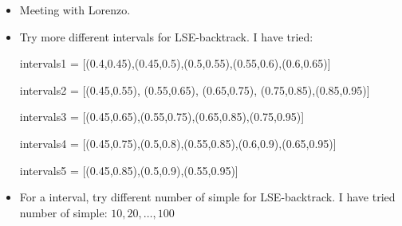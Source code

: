 
\begin{itemize}
	\item Meeting with Lorenzo.
	\item Try more different intervals for LSE-backtrack. I have tried:
	
	intervals1 = [(0.4,0.45),(0.45,0.5),(0.5,0.55),(0.55,0.6),(0.6,0.65)]

    intervals2 = [(0.45,0.55), (0.55,0.65), (0.65,0.75), (0.75,0.85),(0.85,0.95)]

    intervals3 = [(0.45,0.65),(0.55,0.75),(0.65,0.85),(0.75,0.95)]

    intervals4 = [(0.45,0.75),(0.5,0.8),(0.55,0.85),(0.6,0.9),(0.65,0.95)]

    intervals5 = [(0.45,0.85),(0.5,0.9),(0.55,0.95)]
    
	\item For a interval, try different number of simple for LSE-backtrack. I have tried number of simple: $10,20,\dots,100$ 



\end{itemize}